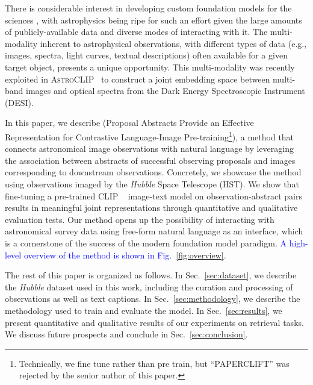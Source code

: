 \documentclass[10pt]{article} %
\newcommand{\hubble}{\emph{Hubble}\xspace}
\newcommand{\changes}[1]{\textcolor{blue}{#1}}
\begin{document}
There is considerable interest in developing custom foundation models for the sciences \citep[e.g., ][]{batatia2023foundation,subramanian2023towards}, with astrophysics being ripe for such an effort given the large amounts of publicly-available data and diverse modes of interacting with it.
%
The multi-modality inherent to astrophysical observations, with different types of data (e.g., images, spectra, light curves, textual descriptions) often available for a given target object, presents a unique opportunity.
%
This multi-modality was recently exploited in \textsc{AstroCLIP}~\citep{lanusse2023astroclip} to construct a joint embedding space between multi-band images and optical spectra from the Dark Energy Spectroscopic Instrument (DESI).
%

In this paper, we describe  (Proposal Abstracts Provide an Effective Representation for Contrastive Language-Image Pre-training\footnote{Technically, we fine tune rather than pre train, but ``PAPERCLIFT'' was rejected by the senior author of this paper.}), a method that connects astronomical image observations with natural language by leveraging the association between abstracts of successful observing proposals and images corresponding to downstream observations. 
%
Concretely, we showcase the method using observations imaged by the \hubble Space Telescope (HST).
%
We show that fine-tuning a pre-trained CLIP ~\citep[Contrastive Language-Image Pre-training; ][]{radford2021learning} image-text model on observation-abstract pairs results in meaningful joint representations through quantitative and qualitative evaluation tests.
%
Our method opens up the possibility of interacting with astronomical survey data using free-form natural language as an interface, which is a cornerstone of the success of the modern foundation model paradigm. \changes{A high-level overview of the method is shown in Fig.~\ref{fig:overview}}.
%

The rest of this paper is organized as follows.
%
In Sec.~\ref{sec:dataset}, we describe the \hubble dataset used in this work, including the curation and processing of observations as well as text captions.
%
In Sec.~\ref{sec:methodology}, we describe the methodology used to train and evaluate the model.
%
In Sec.~\ref{sec:results}, we present quantitative and qualitative results of our experiments on retrieval tasks.
%
We discuss future prospects and conclude in Sec.~\ref{sec:conclusion}.
\end{document}
